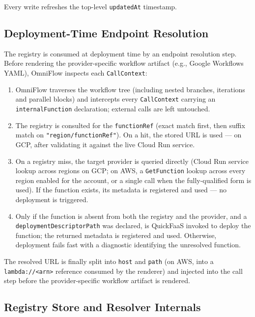 Every write refreshes the top-level \texttt{updatedAt} timestamp.

\subsection{Deployment-Time Endpoint Resolution}
\label{subsec:endpoint-resolution}
The registry is consumed at deployment time by an endpoint resolution step. Before rendering the provider-specific workflow artifact (e.g., Google Workflows YAML), OmniFlow inspects each \texttt{CallContext}:

\begin{enumerate}
    \item OmniFlow traverses the workflow tree (including nested branches, iterations and
    parallel blocks) and intercepts every \texttt{CallContext} carrying an
    \texttt{internalFunction} declaration; external calls are left untouched.
    \item The registry is consulted for the \texttt{functionRef} (exact match first, then
    suffix match on \texttt{"region/functionRef"}). On a hit, the stored URL is used --- on
    GCP, after validating it against the live Cloud Run service.
    \item On a registry miss, the target provider is queried directly (Cloud Run service
    lookup across regions on GCP; on AWS, a \texttt{GetFunction} lookup across every region
    enabled for the account, or a single call when the fully-qualified form is used). If the function
    exists, its metadata is registered and used --- no deployment is triggered.
    \item Only if the function is absent from both the registry and the provider, and a
    \texttt{deploymentDescriptorPath} was declared, is QuickFaaS invoked to deploy the
    function; the returned metadata is registered and used. Otherwise, deployment fails
    fast with a diagnostic identifying the unresolved function.
\end{enumerate}

The resolved URL is finally split into \texttt{host} and \texttt{path} (on AWS, into a
\texttt{lambda://<arn>} reference consumed by the renderer) and injected into the call step
before the provider-specific workflow artifact is rendered.

\subsection{Registry Store and Resolver Internals}
\label{subsec:store-internals}

